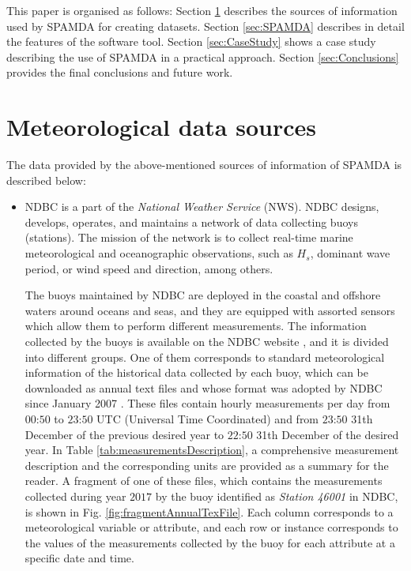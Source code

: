 \documentclass[review]{elsarticle}
\begin{document}
		This paper is organised as follows: Section \ref{sec:DataSources} describes the sources of information used by SPAMDA for creating datasets. Section \ref{sec:SPAMDA} describes in detail the features of the software tool. Section \ref{sec:CaseStudy} shows a case study describing the use of SPAMDA in a practical approach. Section \ref{sec:Conclusions} provides the final conclusions and future work.
		
	\section{Meteorological data sources}\label{sec:DataSources}
		
		The data provided by the above-mentioned sources of information of SPAMDA is described below:
		
		\begin{itemize}
			
			\item NDBC is a part of the \textit{National Weather Service} (NWS). NDBC designs, develops, operates, and maintains a network of data collecting buoys (stations). The mission of the network is to collect real-time marine meteorological and oceanographic observations, such as $H_s$, dominant wave period, or wind speed and direction, among others.

			The buoys maintained by NDBC are deployed in the coastal and offshore waters around oceans and seas, and they are equipped with assorted sensors which allow them to perform different measurements. The information collected by the buoys is available on the NDBC website \cite{NOAA_1}, and it is divided into different groups. One of them corresponds to standard meteorological information of the historical data collected by each buoy, which can be downloaded as annual text files and whose format was adopted by NDBC since January 2007 \cite {NOAA_2}. These files contain hourly measurements per day from $00$:$50$ to $23$:$50$ UTC (Universal Time Coordinated) and from $23$:$50$ 31th December of the previous desired year to $22$:$50$ 31th December of the desired year. In Table \ref{tab:measurementsDescription}, a comprehensive measurement description and the corresponding units are provided as a summary for the reader. A fragment of one of these files, which contains the measurements collected during year $2017$ by the buoy identified as \textit{Station 46001} in NDBC, is shown in Fig. \ref{fig:fragmentAnnualTexFile}. Each column corresponds to a meteorological variable or attribute, and each row or instance corresponds to the values of the measurements collected by the buoy for each attribute at a specific date and time.


\end{itemize}
\end{document}
